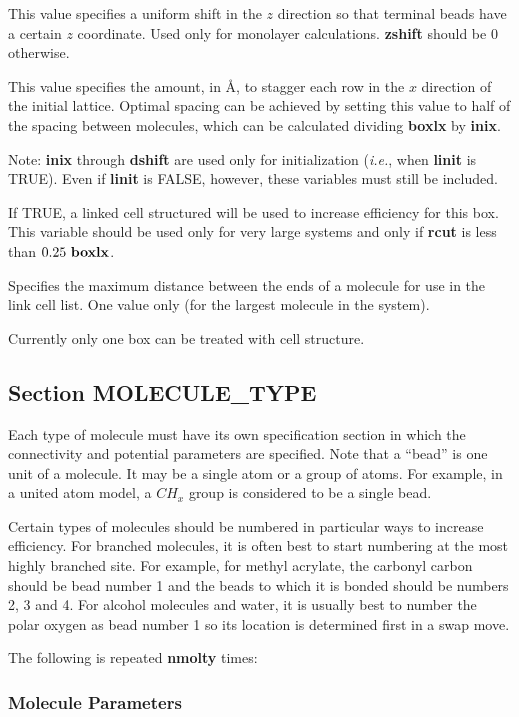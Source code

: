 \documentclass[12pt,letterpaper]{article}
\begin{document}
 This value specifies a uniform shift
in the $z$ direction so that terminal beads have a certain
$z$ coordinate. Used only for monolayer calculations. {\bf
  zshift} should be 0 otherwise.

 This value specifies the amount, in
\AA, to stagger each row in the $x$ direction of the initial
lattice. Optimal spacing can be achieved by setting this
value to half of the spacing between molecules, which can be
calculated dividing {\bf boxlx} by {\bf inix}.

Note: \textbf{inix} through \textbf{dshift} are used only
for initialization (\textit{i.e.}, when {\bf linit} is
TRUE). Even if {\bf linit} is FALSE, however, these
variables must still be included.

 If TRUE, a linked cell
structured will be used to increase efficiency for this box.
This variable should be used only for very large systems and
only if {\bf rcut} is less than $0.25~{\bf boxlx}$.

 Specifies the maximum distance
between the ends of a molecule for use in the link cell
list. One value only (for the largest molecule in the
system).

Currently only one box can be treated with cell structure.

\subsection{Section \textbf{MOLECULE\_TYPE}}
Each type of molecule must have its own specification
section in which the connectivity and potential parameters
are specified. Note that a ``bead'' is one unit of a
molecule. It may be a single atom or a group of atoms. For
example, in a united atom model, a $CH_x$ group is
considered to be a single bead.

Certain types of molecules should be numbered in particular
ways to increase efficiency. For branched molecules, it is
often best to start numbering at the most highly branched
site. For example, for methyl acrylate, the carbonyl carbon
should be bead number 1 and the beads to which it is bonded
should be numbers 2, 3 and 4. For alcohol molecules and
water, it is usually best to number the polar oxygen as bead
number 1 so its location is determined first in a swap move.

The following is repeated {\bf nmolty} times:

\subsubsection{Molecule Parameters}
\end{document}
